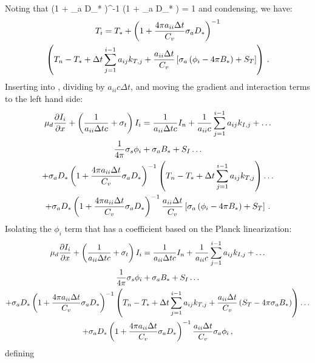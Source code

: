 Noting that 
\benum
\left(1 +  \sigma_a D_*  \right)^{-1} \left(1 +  \sigma_a D_* \right)  = 1 \pec
\eenum
and condensing, we have:
\begin{multline}
T_i = T_* + \left(1 + \frac{4\pi a_{ii} \Delta t}{C_v} \sigma_a D_*  \right)^{-1} \\
\left( T_n - T_* + \Delta t \sum_{j=1}^{i-1}{a_{ij} k_{T,j}} +  \frac{a_{ii} \Delta t }{C_v} \left[ \sigma_a \left( \phi_i - 4\pi   B_* \right) + S_T \right]  \right) \, .
\label{eq:analytic_t_i}
\end{multline}
Inserting  into , dividing by $a_{ii} c \Delta t$, and moving the gradient and interaction terms to the left hand side:
\begin{multline}
\mu_d \frac{\partial I_i}{\partial x} + \left(\frac{1}{a_{ii} \Delta t c} + \sigma_t \right) I_i = \frac{1}{a_{ii} \Delta t c} I_n + \frac{1}{a_{ii} c} \sum_{j=1}^{i-1}{a_{ij} k_{I,j}} + \dots\\
\frac{1}{4\pi}\sigma_{s} \phi_i + \sigma_a B_* + S_I \dots \\
 + \sigma_a D_*\left(1 + \frac{4\pi a_{ii} \Delta t}{C_v} \sigma_a D_*  \right)^{-1} 
\left( T_n - T_* + \Delta t \sum_{j=1}^{i-1}{a_{ij} k_{T,j}} \right) \dots \\
+   \sigma_a D_*\left(1 + \frac{4\pi a_{ii} \Delta t}{C_v} \sigma_a D_*  \right)^{-1}  \frac{a_{ii} \Delta t }{C_v} \left[ \sigma_a \left( \phi_i - 4\pi   B_* \right) + S_T \right]  \, .
\end{multline}
Isolating the $\phi_i$ term that has a coefficient based on the Planck linearization:
\begin{multline}
\mu_d \frac{\partial I_i}{\partial x} + \left(\frac{1}{a_{ii} \Delta t c} + \sigma_t \right) I_i = \frac{1}{a_{ii} \Delta t c} I_n + \frac{1}{a_{ii} c} \sum_{j=1}^{i-1}{a_{ij} k_{I,j}} + \dots\\
\frac{1}{4\pi}\sigma_{s} \phi_i + \sigma_a B_* + S_I \dots \\
 + \sigma_a D_*\left(1 + \frac{4\pi a_{ii} \Delta t}{C_v} \sigma_a D_*  \right)^{-1} 
\left( T_n - T_* + \Delta t \sum_{j=1}^{i-1}{a_{ij} k_{T,j}} +   \frac{a_{ii} \Delta t }{C_v}  \left( S_T -  4\pi  \sigma_a B_*   \right) \right) \dots \\
+   \sigma_a D_*\left(1 + \frac{4\pi a_{ii} \Delta t}{C_v} \sigma_a D_*  \right)^{-1}  \frac{a_{ii} \Delta t }{C_v} \sigma_a  \phi_i  \, ,
\end{multline}
defining 
